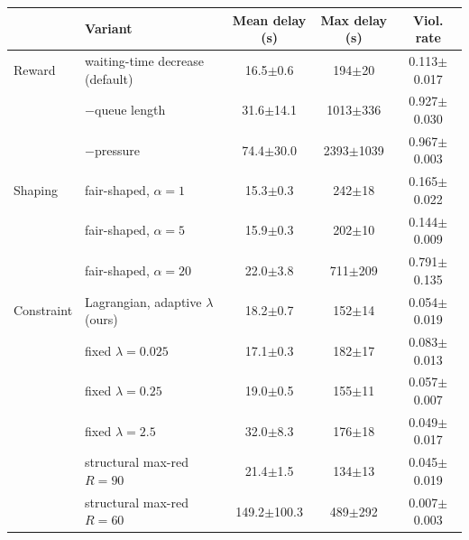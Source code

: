 \begin{tabular}{llccc}
\toprule
 & Variant & Mean delay (s) & Max delay (s) & Viol. rate \\
\midrule
Reward & waiting-time decrease (default) & 16.5\tiny{$\pm$0.6} & 194\tiny{$\pm$20} & 0.113\tiny{$\pm$0.017} \\
 & $-$queue length & 31.6\tiny{$\pm$14.1} & 1013\tiny{$\pm$336} & 0.927\tiny{$\pm$0.030} \\
 & $-$pressure & 74.4\tiny{$\pm$30.0} & 2393\tiny{$\pm$1039} & 0.967\tiny{$\pm$0.003} \\
\midrule
Shaping & fair-shaped, $\alpha{=}1$ & 15.3\tiny{$\pm$0.3} & 242\tiny{$\pm$18} & 0.165\tiny{$\pm$0.022} \\
 & fair-shaped, $\alpha{=}5$ & 15.9\tiny{$\pm$0.3} & 202\tiny{$\pm$10} & 0.144\tiny{$\pm$0.009} \\
 & fair-shaped, $\alpha{=}20$ & 22.0\tiny{$\pm$3.8} & 711\tiny{$\pm$209} & 0.791\tiny{$\pm$0.135} \\
\midrule
Constraint & Lagrangian, adaptive $\lambda$ (ours) & 18.2\tiny{$\pm$0.7} & 152\tiny{$\pm$14} & 0.054\tiny{$\pm$0.019} \\
 & fixed $\lambda{=}0.025$ & 17.1\tiny{$\pm$0.3} & 182\tiny{$\pm$17} & 0.083\tiny{$\pm$0.013} \\
 & fixed $\lambda{=}0.25$ & 19.0\tiny{$\pm$0.5} & 155\tiny{$\pm$11} & 0.057\tiny{$\pm$0.007} \\
 & fixed $\lambda{=}2.5$ & 32.0\tiny{$\pm$8.3} & 176\tiny{$\pm$18} & 0.049\tiny{$\pm$0.017} \\
 & structural max-red $R{=}90$ & 21.4\tiny{$\pm$1.5} & 134\tiny{$\pm$13} & 0.045\tiny{$\pm$0.019} \\
 & structural max-red $R{=}60$ & 149.2\tiny{$\pm$100.3} & 489\tiny{$\pm$292} & 0.007\tiny{$\pm$0.003} \\
\bottomrule
\end{tabular}